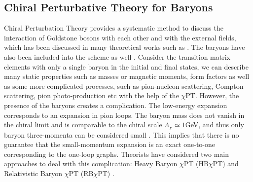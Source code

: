 \subsection{Chiral Perturbative Theory for Baryons}
\label{C3S1SS3}

Chiral Perturbation Theory provides a systematic method to discuss the interaction of Goldstone bosons with each other and with the external fields, which has been discussed in many theoretical works such as \cite{Gasser1984,Gasser1985}. The baryons have also been included into the scheme as well \cite{Bernard1992}. Consider the transition matrix elements with only a single baryon in the initial and final states, we can describe many static properties such as masses or magnetic moments, form factors as well as some more complicated processes, such as pion-nucleon scattering, Compton scattering, pion photo-production etc with the help of the $\chi$PT. However, the presence of the baryons creates a complication. The low-energy expansion corresponds to an expansion in pion loops. The baryon mass does not vanish in the chiral limit and is comparable to the chiral scale $\Lambda_\chi\simeq 1$GeV, and thus only baryon three-momenta can be considered small \cite{Bernard1993}. This implies that there is no guarantee that the small-momentum expansion is an exact one-to-one corresponding to the one-loop graphs. Theorists have considered two main approaches to deal with this complication: Heavy Baryon $\chi$PT (HB$\chi$PT) \cite{Jenkins1991a,Jenkins1991b} and Relativistic Baryon $\chi$PT (RB$\chi$PT) \cite{Ellis2003}.

\hspace{1cm} \newline

